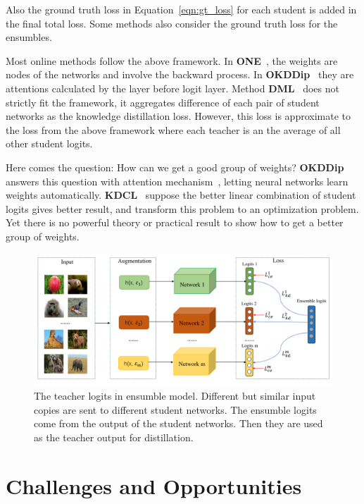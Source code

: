 \documentclass[10pt,twocolumn,letterpaper]{article}
\begin{document}
Also the ground truth loss in Equation~\eqref{eqn:gt_loss} for each student is added in the final total loss. Some methods also consider
the ground truth loss for the ensumbles.

Most online methods follow the above framework. In \textbf{ONE}~\cite{lan2018knowledge}, the weights are nodes of the networks and involve the backward process.
In \textbf{OKDDip}~\cite{chen2020online} they are attentions calculated by the layer before logit layer. Method \textbf{DML}~\cite{zhang2018deep} does not strictly fit the framework, it
aggregates difference of each pair of student networks as the knowledge distillation loss. However, this loss is approximate to the loss from the above framework where each teacher is
an the average of all other student logits.

Here comes the question:
How can we get a good group of
weights? \textbf{OKDDip}~\cite{chen2020online} answers
this question with attention mechanism~\cite{vaswani2017attention}, letting neural networks learn weights automatically.
\textbf{KDCL}~\cite{guo2020online} suppose the better linear
combination of student logits gives better result,
and transform this problem to an optimization problem.
Yet there is no powerful theory or practical result to show how to get a better group of weights.


\begin{figure}
\begin{center}
\includegraphics[width=0.9\linewidth]{ensumble_teacher.png}
\end{center}
   \caption{The teacher logits in ensumble model. Different but similar input copies are sent to different student networks. The ensumble logits come from the output of the student networks. Then they are used as the teacher output for distillation.}
\label{fig:ensumble_teacher}
\end{figure}

\section{Challenges and Opportunities}\label{review}
\end{document}
